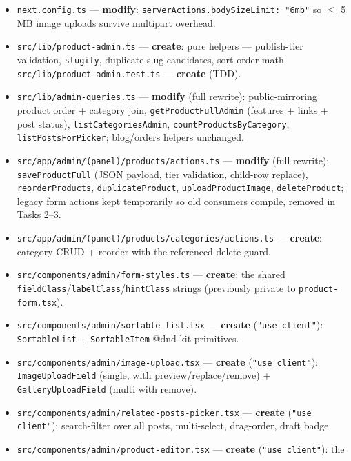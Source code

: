 \documentclass[11pt,a4paper]{article}
\begin{document}
\begin{itemize}
  \item \texttt{next.config.ts} --- \textbf{modify}: \texttt{serverActions.bodySizeLimit: "6mb"} so
        $\leq$ 5\,MB image uploads survive multipart overhead.
  \item \texttt{src/lib/product-admin.ts} --- \textbf{create}: pure helpers --- publish-tier validation,
        \texttt{slugify}, duplicate-slug candidates, sort-order math. \texttt{src/lib/product-admin.test.ts}
        --- \textbf{create} (TDD).
  \item \texttt{src/lib/admin-queries.ts} --- \textbf{modify} (full rewrite): public-mirroring product
        order + category join, \texttt{getProductFullAdmin} (features + links + post status),
        \texttt{listCategoriesAdmin}, \texttt{countProductsByCategory}, \texttt{listPostsForPicker};
        blog/orders helpers unchanged.
  \item \texttt{src/app/admin/(panel)/products/actions.ts} --- \textbf{modify} (full rewrite):
        \texttt{saveProductFull} (JSON payload, tier validation, child-row replace),
        \texttt{reorderProducts}, \texttt{duplicateProduct}, \texttt{uploadProductImage},
        \texttt{deleteProduct}; legacy form actions kept temporarily so old consumers compile, removed in
        Tasks 2--3.
  \item \texttt{src/app/admin/(panel)/products/categories/actions.ts} --- \textbf{create}: category CRUD
        + reorder with the referenced-delete guard.
  \item \texttt{src/components/admin/form-styles.ts} --- \textbf{create}: the shared
        \texttt{fieldClass}/\texttt{labelClass}/\texttt{hintClass} strings (previously private to
        \texttt{product-form.tsx}).
  \item \texttt{src/components/admin/sortable-list.tsx} --- \textbf{create} (\texttt{"use client"}):
        \texttt{SortableList} + \texttt{SortableItem} @dnd-kit primitives.
  \item \texttt{src/components/admin/image-upload.tsx} --- \textbf{create} (\texttt{"use client"}):
        \texttt{ImageUploadField} (single, with preview/replace/remove) + \texttt{GalleryUploadField}
        (multi with remove).
  \item \texttt{src/components/admin/related-posts-picker.tsx} --- \textbf{create}
        (\texttt{"use client"}): search-filter over all posts, multi-select, drag-order, draft badge.
  \item \texttt{src/components/admin/product-editor.tsx} --- \textbf{create} (\texttt{"use client"}): the

\end{itemize}
\end{document}
